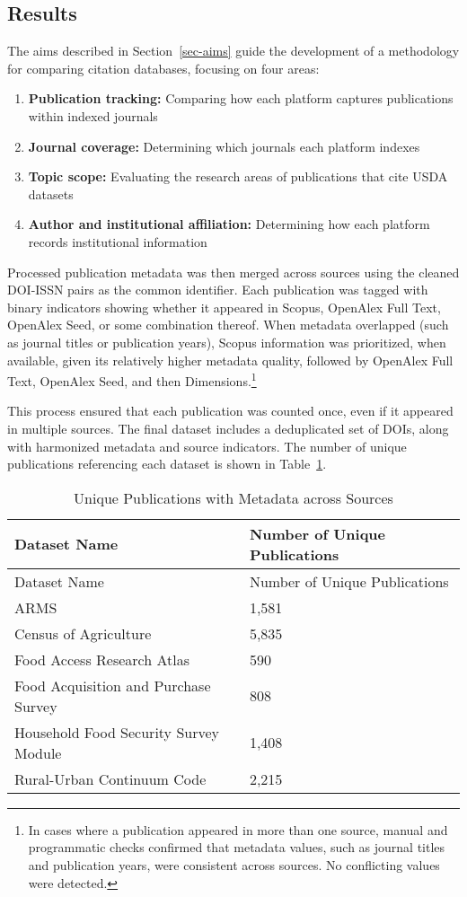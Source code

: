 \documentclass[
  letterpaper,
  DIV=11,
  numbers=noendperiod]{scrartcl}
\begin{document}
\subsection{Results}\label{results}

The aims described in Section~\ref{sec-aims} guide the development of a
methodology for comparing citation databases, focusing on four areas:

\begin{enumerate}
\def\labelenumi{\arabic{enumi}.}
\item
  \textbf{Publication tracking:} Comparing how each platform captures
  publications within indexed journals
\item
  \textbf{Journal coverage:} Determining which journals each platform
  indexes
\item
  \textbf{Topic scope:} Evaluating the research areas of publications
  that cite USDA datasets
\item
  \textbf{Author and institutional affiliation:} Determining how each
  platform records institutional information
\end{enumerate}

Processed publication metadata was then merged across sources using the
cleaned DOI-ISSN pairs as the common identifier. Each publication was
tagged with binary indicators showing whether it appeared in Scopus,
OpenAlex Full Text, OpenAlex Seed, or some combination thereof. When
metadata overlapped (such as journal titles or publication years),
Scopus information was prioritized, when available, given its relatively
higher metadata quality, followed by OpenAlex Full Text, OpenAlex Seed,
and then Dimensions.\footnote{In cases where a publication appeared in
  more than one source, manual and programmatic checks confirmed that
  metadata values, such as journal titles and publication years, were
  consistent across sources. No conflicting values were detected.}

This process ensured that each publication was counted once, even if it
appeared in multiple sources. The final dataset includes a deduplicated
set of DOIs, along with harmonized metadata and source indicators. The
number of unique publications referencing each dataset is shown in
Table~\ref{tbl-pub-counts}.

\begin{longtable}[]{@{}ll@{}}
\caption{Unique Publications with Metadata across
Sources}\label{tbl-pub-counts}\tabularnewline
\toprule\noalign{}
Dataset Name & Number of Unique Publications \\
\midrule\noalign{}
\endfirsthead
\toprule\noalign{}
Dataset Name & Number of Unique Publications \\
\midrule\noalign{}
\endhead
\bottomrule\noalign{}
\endlastfoot
ARMS & 1,581 \\
Census of Agriculture & 5,835 \\
Food Access Research Atlas & 590 \\
Food Acquisition and Purchase Survey & 808 \\
Household Food Security Survey Module & 1,408 \\
Rural-Urban Continuum Code & 2,215 \\
\end{longtable}
\end{document}
